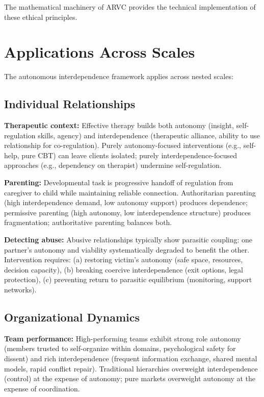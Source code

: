 \documentclass[11pt,a4paper]{article}
\begin{document}
The mathematical machinery of ARVC provides the technical implementation of these ethical principles.

\section{Applications Across Scales}

The autonomous interdependence framework applies across nested scales:

\subsection{Individual Relationships}

\textbf{Therapeutic context:} Effective therapy builds both autonomy (insight, self-regulation skills, agency) and interdependence (therapeutic alliance, ability to use relationship for co-regulation). Purely autonomy-focused interventions (e.g., self-help, pure CBT) can leave clients isolated; purely interdependence-focused approaches (e.g., dependency on therapist) undermine self-regulation.

\textbf{Parenting:} Developmental task is progressive handoff of regulation from caregiver to child while maintaining reliable connection. Authoritarian parenting (high interdependence demand, low autonomy support) produces dependence; permissive parenting (high autonomy, low interdependence structure) produces fragmentation; authoritative parenting balances both.

\textbf{Detecting abuse:} Abusive relationships typically show parasitic coupling: one partner's autonomy and viability systematically degraded to benefit the other. Intervention requires: (a) restoring victim's autonomy (safe space, resources, decision capacity), (b) breaking coercive interdependence (exit options, legal protection), (c) preventing return to parasitic equilibrium (monitoring, support networks).

\subsection{Organizational Dynamics}

\textbf{Team performance:} High-performing teams exhibit strong role autonomy (members trusted to self-organize within domains, psychological safety for dissent) and rich interdependence (frequent information exchange, shared mental models, rapid conflict repair). Traditional hierarchies overweight interdependence (control) at the expense of autonomy; pure markets overweight autonomy at the expense of coordination.
\end{document}
